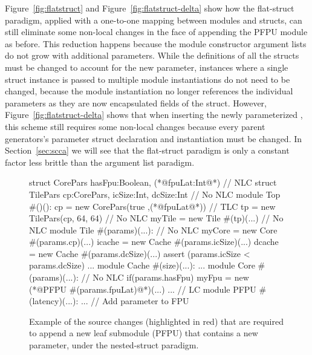 Figure~\ref{fig:flatstruct} and Figure~\ref{fig:flatstruct-delta} show how the flat-struct paradigm,
applied with a one-to-one mapping between modules and structs,
can still eliminate some non-local changes in the face of appending the PFPU module as before.
This reduction happens because the module constructor argument lists do not grow with additional parameters.
While the definitions of all the structs must be changed to account for the new parameter,
instances where a single struct instance is passed to multiple module instantiations do not need to be changed,
because the module instantiation no longer references the individual parameters as they are now encapsulated fields of the struct.
However, Figure~\ref{fig:flatstruct-delta} shows that when inserting the newly parameterized ,
this scheme still requires some non-local changes because every parent generators's parameter struct declaration and instantiation must be changed.
In Section~\ref{sec:scca} we will see that the flat-struct paradigm is only a constant factor less brittle than the argument list paradigm.

\begin{figure}
\centering
\begin{phdl}
struct CorePars {hasFpu:Boolean, (*@\textcolor[rgb]{1,0,0}{fpuLat:Int}@*)}                     // NLC
struct TilePars {cp:CorePars, icSize:Int, dcSize:Int}            // No NLC
module Top #()():
  cp = new CorePars(true ,(*@\textcolor[rgb]{1,0,0}{fpuLat}@*))                                // TLC
  tp = new TilePars(cp, 64, 64)                                  // No NLC
  myTile = new Tile #(tp)(...)                                   // No NLC
module Tile #(params)(...):                                      // No NLC
  myCore = new Core  #(params.cp)(...)                                                        
  icache = new Cache #(params.icSize)(...)
  dcache = new Cache #(params.dcSize)(...)
  assert (params.icSize < params.dcSize) ...
module Cache #(size)(...): ...
module Core #(params)(...):                                     // No NLC
  if(params.hasFpu) myFpu = new (*@\textcolor[rgb]{1,0,0}{PFPU \#(params.fpuLat)}@*)(...) ...   // LC
module PFPU #(latency)(...): ...     // Add parameter to FPU 
\end{phdl} 
\caption[Modifying the example with nested structs.]{Example of the source changes (highlighted in red) that are required to append a new leaf submodule (PFPU) that contains a new parameter,
under the nested-struct paradigm.}
\label{fig:nestedstruct-append}
\end{figure}

